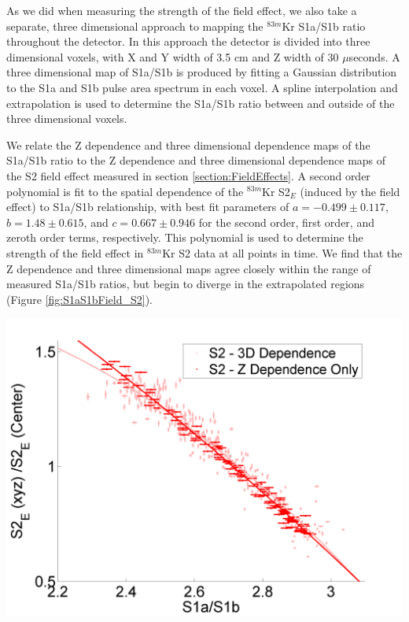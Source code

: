 \documentclass[a4paper,10pt,twocolumn]{article}
\begin{document}
As we did when measuring the strength of the field effect, we also take a separate, three dimensional approach to mapping the $^{83m}$Kr S1a/S1b ratio throughout the detector. In this approach the detector is divided into three dimensional voxels, with X and Y width of 3.5 cm and Z width of 30 $\mu$seconds.  A three dimensional map of S1a/S1b is produced by fitting a Gaussian distribution to the S1a and S1b pulse area spectrum in each voxel.  A spline interpolation and extrapolation is used to determine the S1a/S1b ratio between and outside of the three dimensional voxels.

We relate the Z dependence and three dimensional dependence maps of the S1a/S1b ratio to the Z dependence and three dimensional dependence maps of the S2 field effect measured in section \ref{section:FieldEffects}.  A second order polynomial is fit to the spatial dependence of the $^{83m}$Kr S2$_E$ (induced by the field effect) to S1a/S1b relationship, with best fit parameters of $a=-0.499 \pm 0.117$,$b=1.48 \pm 0.615$, and $c=0.667 \pm 0.946$ for the second order, first order, and zeroth order terms, respectively. This polynomial is used to determine the strength of the field effect in $^{83m}$Kr S2 data at all points in time.  We find that the Z dependence and three dimensional maps agree closely within the range of measured S1a/S1b ratios, but begin to diverge in the extrapolated regions (Figure \ref{fig:S1aS1bField_S2}). 

\begin{center}
\includegraphics[scale=0.4]{Run04Corrections/S1aS1bvField_ZDep_3D_S2Only.png}
 \label{fig:S1aS1bField_S2}
\end{center}
\end{document}

